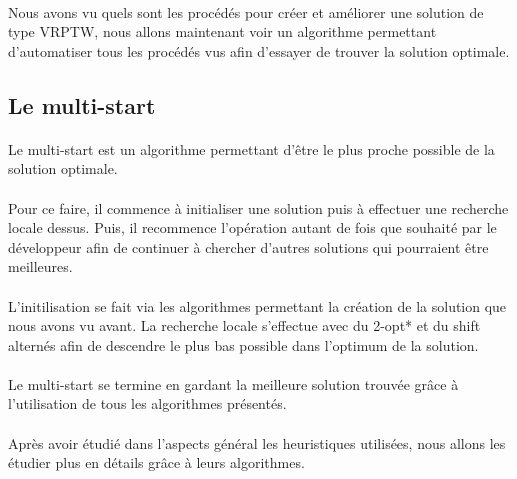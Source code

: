 \documentclass[12pt]{article}
\begin{document}
\paragraph{}
Nous avons vu quels sont les procédés pour créer et améliorer une solution de type VRPTW, nous allons maintenant voir un algorithme permettant 
d'automatiser tous les procédés vus afin d'essayer de trouver la solution optimale.

\subsection{Le multi-start}

\paragraph{}
Le multi-start est un algorithme permettant d'être le plus proche possible de la solution optimale. 

\paragraph{}
Pour ce faire, il commence à initialiser une solution puis à effectuer une recherche locale dessus. Puis, il recommence l'opération autant de fois 
que souhaité par le développeur afin de continuer à chercher d'autres solutions qui pourraient être meilleures.

\paragraph{}
L'initilisation se fait via les algorithmes permettant la création de la solution que nous avons vu avant. La recherche locale s'effectue avec du 2-opt* 
et du shift alternés afin de descendre le plus bas possible dans l'optimum de la solution.

\paragraph{}
Le multi-start se termine en gardant la meilleure solution trouvée grâce à l'utilisation de tous les algorithmes présentés.

\paragraph{}
Après avoir étudié dans l'aspects général les heuristiques utilisées, nous allons les étudier plus en détails grâce à leurs algorithmes.
\end{document}

